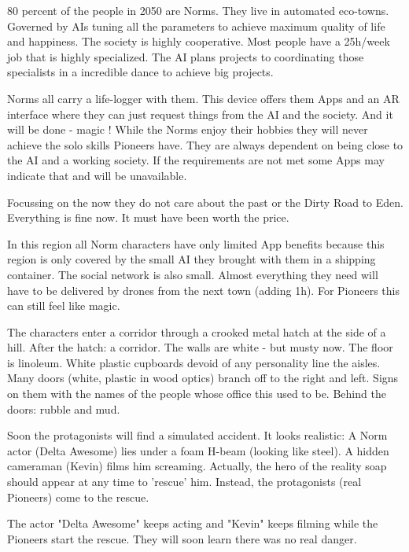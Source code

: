 \begin{sidebarBox}[title=Norms]

80 percent of the people in 2050 are Norms. They live in automated eco-towns. Governed by AIs tuning all the parameters to achieve maximum quality of life and happiness. The society is highly cooperative. Most people have a 25h/week job that is highly specialized. The AI plans projects to coordinating those specialists in a incredible dance to achieve big projects.

Norms all carry a life-logger with them. This device offers them Apps and an AR interface where they can just request things from the AI and the society. And it will be done - magic !
While the Norms enjoy their hobbies they will never achieve the solo skills Pioneers have. They are always dependent on being close to the AI and a working society. If the requirements are not met some Apps may indicate that and will be unavailable.

Focussing on the now they do not care about the past or the Dirty Road to Eden. Everything is fine now. It must have been worth the price.

In this region all Norm characters have only limited App benefits because this region is only covered by the small AI they brought with them in a shipping container. The social network is also small. Almost everything they need will have to be delivered by drones from the next town (adding 1h). For Pioneers this can still feel like magic.

\end{sidebarBox}

The characters enter a corridor through a crooked metal hatch at the side of a hill. After the hatch: a corridor. The walls are white - but musty now. The floor is linoleum.
White plastic cupboards devoid of any personality line the aisles. Many doors (white, plastic in wood optics) branch off to the right and left. Signs on them with the names of the people whose office this used to be. Behind the doors: rubble and mud.


Soon the protagonists will find a simulated accident. It looks realistic: A Norm actor (Delta Awesome) lies under a foam H-beam (looking like steel). A hidden cameraman (Kevin) films him screaming. Actually, the hero of the reality soap should appear at any time to 'rescue' him. Instead, the protagonists (real Pioneers) come to the rescue.

The actor "Delta Awesome" keeps acting and "Kevin" keeps filming while the Pioneers start the rescue. They will soon learn there was no real danger.

